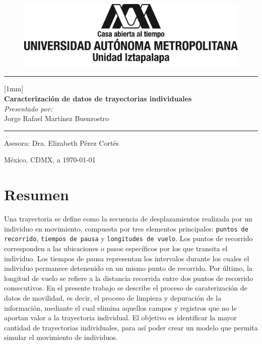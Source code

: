 \documentclass[letterpaper,11pt,spanish]{report}
\begin{document}
\thispagestyle{empty}

\begin{figure}[h]
    \centering
    \includegraphics[scale=0.6]{img/logoUAM.png}
\end{figure}

\begin{center}
    \rule{\textwidth}{0.5pt}

    [1mm]\\{\LARGE\bfseries Caracterización de datos de trayectorias individuales}\\[1cm]
    {\normalsize\itshape Presentado por:}\\
    {\large Jorge Rafael Martínez Buenrostro}
    \rule{\textwidth}{0.5pt}
\end{center}

\vspace{2cm}
\begin{center}
    {\large Asesora: Dra. Elizabeth Pérez Cortés}    
\end{center}

\vfill  
\begin{center}
    México, CDMX, a \today
\end{center}

\vspace{2cm}

\setcounter{page}{0}
\pagestyle{plain}
\chapter*{Resumen}
Una trayectoria se define como la secuencia de desplazamientos realizada por un individuo en movimiento, compuesta por tres elementos principales: \texttt{puntos de recorrido}, \texttt{tiempos de pausa} y \texttt{longitudes de vuelo}. Los puntos de recorrido corresponden a las ubicaciones o pasos específicos por los que transita el individuo. Los tiempos de pausa representan los intervalos durante los cuales el individuo permanece detenenido en un mismo punto de recorrido. Por último, la longitud de vuelo se refiere a la distancia recorrida entre dos puntos de recorrido consecutivos. En el presente trabajo se describe el proceso de caraterización de datos de movilidad, es decir, el proceso de limpieza y depuración de la información, mediante el cual elimina aquellos campos y registros que no le aportan valor a la trayectoria individual. El objetivo es identificar la mayor cantidad de trayectorias individuales, para así poder crear un modelo que permita simular el movimiento de individuos.
\end{document}
